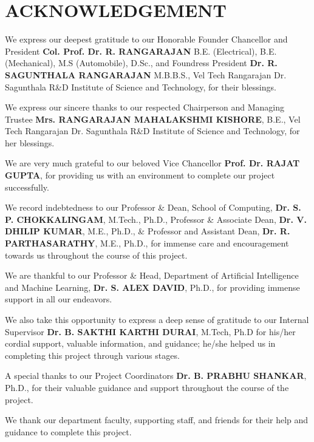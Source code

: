 \documentclass[12pt,a4paper]{report}
\begin{document}
\setcounter{page}{3}

\chapter*{ACKNOWLEDGEMENT}

We express our deepest gratitude to our Honorable Founder Chancellor and President \textbf{Col. Prof. Dr. R. RANGARAJAN} B.E. (Electrical), B.E. (Mechanical), M.S (Automobile), D.Sc., and Foundress President \textbf{Dr. R. SAGUNTHALA RANGARAJAN} M.B.B.S., Vel Tech Rangarajan Dr. Sagunthala R\&D Institute of Science and Technology, for their blessings.

We express our sincere thanks to our respected Chairperson and Managing Trustee \textbf{Mrs. RANGARAJAN MAHALAKSHMI KISHORE}, B.E., Vel Tech Rangarajan Dr. Sagunthala R\&D Institute of Science and Technology, for her blessings.

We are very much grateful to our beloved Vice Chancellor \textbf{Prof. Dr. RAJAT GUPTA}, for providing us with an environment to complete our project successfully.

We record indebtedness to our Professor \& Dean, School of Computing, \textbf{Dr. S. P. CHOKKALINGAM}, M.Tech., Ph.D., Professor \& Associate Dean, \textbf{Dr. V. DHILIP KUMAR}, M.E., Ph.D., \& Professor and Assistant Dean, \textbf{Dr. R. PARTHASARATHY}, M.E., Ph.D., for immense care and encouragement towards us throughout the course of this project.

We are thankful to our Professor \& Head, Department of Artificial Intelligence and Machine Learning, \textbf{Dr. S. ALEX DAVID}, Ph.D., for providing immense support in all our endeavors.

We also take this opportunity to express a deep sense of gratitude to our Internal Supervisor \textbf{Dr. B. SAKTHI KARTHI DURAI}, M.Tech, Ph.D for his/her cordial support, valuable information, and guidance; he/she helped us in completing this project through various stages.

A special thanks to our Project Coordinators \textbf{Dr. B. PRABHU SHANKAR}, Ph.D., for their valuable guidance and support throughout the course of the project.

We thank our department faculty, supporting staff, and friends for their help and guidance to complete this project.
\end{document}
